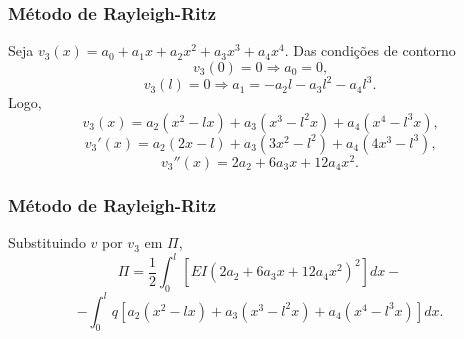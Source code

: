 \documentclass{beamer}
\begin{document}
%		
%	
%		
%	
%		
	
	\begin{frame}
		\frametitle{Método de Rayleigh-Ritz}
		\justify
		
		Seja $v_3(x)=a_0 + a_1 x + a_2 x^2 + a_3 x^3 + a_4 x^4$. \pause Das condições de contorno
		$$
			v_3(0)=0\Longrightarrow a_0 = 0\text{,}
		$$
		\pause
		$$
			v_3(l)=0\Longrightarrow a_1 = -a_2l - a_3l^2 - a_4l^3\text{.}
		$$
		\pause
		Logo, 
		$$v_3(x)=a_2(x^2-lx)+a_3(x^3-l^2x) + a_4(x^4-l^3x)\text{,}$$
		\pause 
		$$v_3'(x)=a_2(2x-l)+a_3(3x^2-l^2)+a_4(4x^3-l^3)\text{,}$$
		\pause
		$$v_3''(x)=2a_2 + 6a_3x + 12a_4x^2\text{.}$$
	\end{frame}
	
	\begin{frame}
		\frametitle{Método de Rayleigh-Ritz}
		\justify
		
		Substituindo $v$ por $v_3$ em $\Pi$,
		$$
			\Pi = \frac{1}{2} \int_0^l \left [
				EI(2a_2+6a_3x+12a_4x^2)^2
			\right ] dx
			-
		$$
		$$
			-
			\int_0^l q \left [
				a_2(x^2 - lx)
				+
				a_3(x^3 - l^2x)
				+
				a_4(x^4 - l^3x)
			\right ] dx
			\text{.}
		$$
	\end{frame}
	
\end{document}
